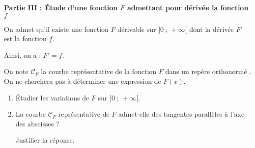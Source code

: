 \bigskip

\textbf{Partie III : Étude d'une fonction \boldmath $F$\unboldmath{} admettant pour dérivée la fonction \boldmath $f$\unboldmath}

\medskip

On admet qu'il existe une fonction $F$ dérivable sur $]0~;~ +\infty[$ dont la dérivée $F'$ est la fonction $f$.

Ainsi, on a : $F' = f$.

On note $\mathcal{C}_F$ la courbe représentative de la fonction $F$ dans un repère orthonormé \Oij. On ne cherchera pas à déterminer une expression de $F(x)$.

\medskip

\begin{enumerate}
\item Étudier les variations de $F$ sur $]0~;~ +\infty[$.
\item La courbe $\mathcal{C}_F$ représentative  de $F$ admet-elle des tangentes parallèles à l'axe des abscisses ?

Justifier la réponse.
\end{enumerate}
